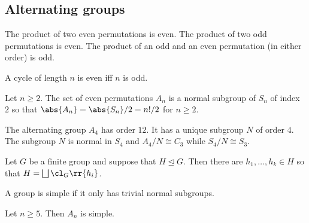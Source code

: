 \documentclass{article}
\begin{document}
\subsection{Alternating groups}

\begin{lemma}
  The product of two even permutations is even. The product of two odd permutations
  is even. The product of an odd and an even permutation (in either order) is odd.

  A cycle of length $n$ is even iff $n$ is odd.
\end{lemma}

\begin{theorem}
  Let $n\geq 2$. The set of even permutations $A_n$ is a normal subgroup of $S_n$
  of index $2$ so that $\abs{A_n}=\abs{S_n}/2=n!/2$ for $n\geq 2$.
\end{theorem}

\begin{proposition}
  The alternating group $A_4$ has order $12$. It has a unique subgroup $N$ of order $4$.
  The subgroup $N$ is normal in $S_4$ and $A_4/N\cong C_3$ while $S_4/N\cong S_3$.
\end{proposition}

\begin{lemma}
  Let $G$ be a finite group and suppose that $H\trianglelefteq G$. Then there are
  $h_1,\ldots,h_k\in H$ so that $H=\bigsqcup\cl_G\rr{h_i}$.
\end{lemma}

\begin{definition}
  A group is simple if it only has trivial normal subgroups.
\end{definition}

\begin{theorem}
  Let $n\geq 5$. Then $A_n$ is simple.
\end{theorem}
\end{document}
